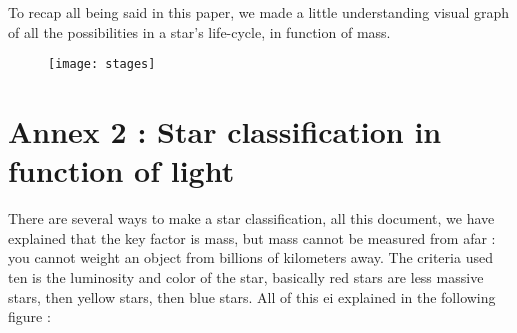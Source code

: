 \documentclass[a4paper, 11pt]{article} %
\begin{document}
To recap all being said in this paper, we made a little understanding visual graph of all the possibilities in a star's life-cycle, in function of mass.



\begin{figure}[h]
\centering


\texttt{[image: stages]}
\end{figure}
\newpage
\section*{Annex 2 : Star classification in function of light}

There are several ways to make a star classification, all this document, we have explained that the key factor is mass, but mass cannot be measured from afar : you cannot weight an object from billions of kilometers away. The criteria used ten is the luminosity and color of the star, basically red stars are less massive stars, then yellow stars, then blue stars. All of this ei explained in the following figure	 :
\end{document}
